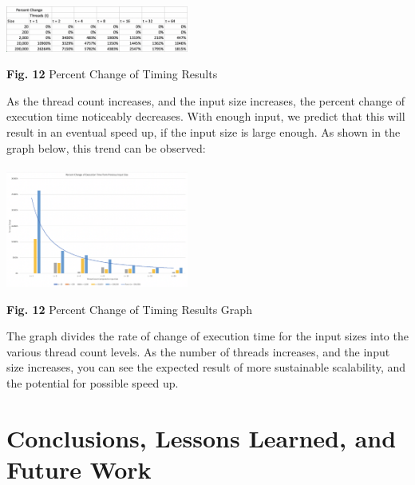 \documentclass[conference]{IEEEtran}
\begin{document}
\includegraphics[width=0.45\textwidth]{images/percentChange}
\begin{center}
	\textbf{Fig. 12} Percent Change of Timing Results \\
\end{center}

As the thread count increases, and the input size increases, the percent change of execution time noticeably decreases.  With enough input, we predict that this will result in an eventual speed up, if the input size is large enough. As shown in the graph below, this trend can be observed: \\ \\
\includegraphics[width=0.45\textwidth]{images/percentChangeGraph}
\begin{center}
	\textbf{Fig. 12} Percent Change of Timing Results Graph \\
\end{center}

The graph divides the rate of change of execution time for the input sizes into the various thread count levels. As the number of threads increases, and the input size increases, you can see the expected result of more sustainable scalability, and the potential for possible speed up. \\

\section{Conclusions, Lessons Learned, and Future Work}



\end{document}
